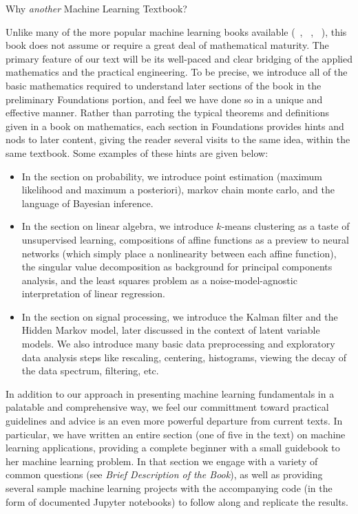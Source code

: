 \documentclass[10pt]{article}
\newenvironment{changemargin}[2]{%
\begin{list}{}{%
\setlength{\topsep}{0pt}%
\setlength{\leftmargin}{#1}%
\setlength{\rightmargin}{#2}%
\setlength{\listparindent}{\parindent}%
\setlength{\itemindent}{\parindent}%
\setlength{\parsep}{\parskip}%
}%
\item[]}{\end{list}}
\renewcommand{\it}{\textit}
\begin{document}
\begin{changemargin}{+-1cm}{-3cm}
\vspace{1cm}
\noindent
\large{Why \it{another} Machine Learning Textbook?}\\
\small

Unlike many of the more popular machine learning books available (~\cite{murphy2012machine}, ~\cite{bishop2016pattern}, ~\cite{hastie2013elements}), this book does not assume or require a great deal of mathematical maturity. The primary feature of our text will be its well-paced and clear bridging of the applied mathematics and the practical engineering. To be precise, we introduce all of the basic mathematics required to understand later sections of the book in the preliminary Foundations portion, and feel we have done so in a unique and effective manner. Rather than parroting the typical theorems and definitions given in a book on mathematics, each section in Foundations provides hints and nods to later content, giving the reader several visits to the same idea, within the same textbook. Some examples of these hints are given below:

\begin{itemize}
  \item In the section on probability, we introduce point estimation (maximum likelihood and maximum a posteriori), markov chain monte carlo, and the language of Bayesian inference.
  \item In the section on linear algebra, we introduce $k$-means clustering as a taste of unsupervised learning, compositions of affine functions as a preview to neural networks (which simply place a nonlinearity between each affine function), the singular value decomposition as background for principal components analysis, and the least squares problem as a noise-model-agnostic interpretation of linear regression.
  \item In the section on signal processing, we introduce the Kalman filter and the Hidden Markov model, later discussed in the context of latent variable models. We also introduce many basic data preprocessing and exploratory data analysis steps like rescaling, centering, histograms, viewing the decay of the data spectrum, filtering, etc.
\end{itemize}

In addition to our approach in presenting machine learning fundamentals in a palatable and comprehensive way, we feel our committment toward practical guidelines and advice is an even more powerful departure from current texts. In particular, we have written an entire section (one of five in the text) on machine learning applications, providing a complete beginner with a small guidebook to her machine learning problem. In that section we engage with a variety of common questions (see \it{Brief Description of the Book}), as well as providing several sample machine learning projects with the accompanying code (in the form of documented Jupyter notebooks) to follow along and replicate the results. \\


\end{changemargin}
\end{document}
